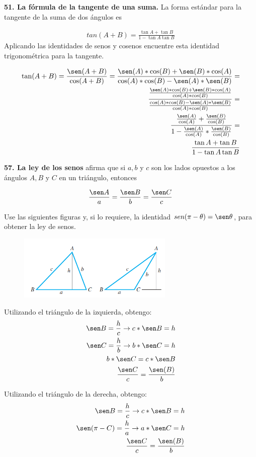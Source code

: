 \documentclass[12pt, letterpaper]{article}
\begin{document}
 \newpage
\textbf{51. La fórmula de la tangente de una suma.} La forma estándar para la tangente de la suma de dos ángulos es

\begin{align*}
	tan (A + B) =  \frac{\tan A + \tan B}{1 - \tan A \tan B}
\end{align*}
Aplicando las identidades de senos y cosenos encuentre esta identidad trigonométrica para la tangente.

\textcolor{blue}{
\begin{align*}
	\tan(A+B) = \frac{\sen(A+B)}{\cos(A+B)} = \frac{\sen(A) * \cos (B) + \sen(B) * \cos (A) }{\cos(A) * \cos (B) - \sen(A)*\sen(B)} =\\
	\frac{\frac{\sen (A)*\cos(B)+\sen(B)*\cos(A)}{\cos(A)*\cos(B)}}{\frac{\cos(A)*\cos(B)-\sen(A)*\sen(B)}{\cos(A)*\cos(B)}} =\\
	\frac{\frac{\sen(A)}{\cos(A)} + \frac{\sen(B)}{\cos(B)}}{1-\frac{\sen(A)}{\cos(A)}*\frac{\sen(B)}{\cos(B)}} =\\
	\frac{\tan A + \tan B}{1 - \tan A \tan B}
\end{align*}
} 

\textbf{57. La ley de los senos} afirma que si $a, b$ y $c$ son los lados opuestos a los ángulos $A, B$ y $C$ en un triángulo, entonces

\begin{align*}
 	\frac{\sen A}{a} =  \frac{\sen B}{b} = \frac{\sen C}{c}
\end{align*}

Use las siguientes figuras y, si lo requiere, la identidad $sen(\pi - \theta) = \sen \theta$, para obtener la ley de senos.

\begin{figure}[ht]
\centering
\includegraphics[width=20em]{t7uno}
\end{figure}


Utilizando el triángulo de la izquierda, obtengo:
\begin{align*}
 	\sen B = \frac{h}{c} \rightarrow c * \sen B = h \\
	\sen C =\frac{h}{b} \rightarrow b * \sen C = h\\
	b * \sen C =  c * \sen B\\
	\frac{\sen C}{c} = \frac{\sen (B)}{b}
\end{align*}

Utilizando el triángulo de la derecha, obtengo:
\begin{align*}
	\sen B =\frac{h}{c} \rightarrow  c* \sen B = h\\
	\sen (\pi - C) =  \frac{h}{a} \rightarrow a  * \sen C=h\\
	\frac{\sen C}{c} = \frac{\sen (B)}{b}
\end{align*}
\end{document}
